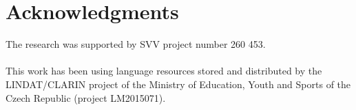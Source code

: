 \documentclass{svproc}
\begin{document}
\section*{Acknowledgments}

The research was supported by SVV project number 260 453.\\
\\
This work has been using language resources stored
and distributed  by the LINDAT/CLARIN project of the Ministry of Education,
Youth and Sports of the Czech Republic (project LM2015071).



\end{document}
